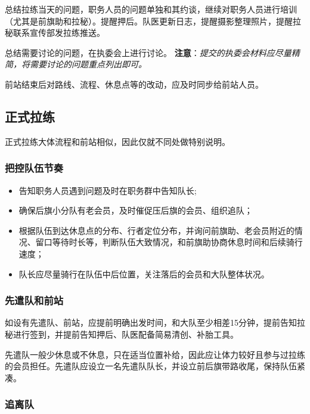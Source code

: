 \documentclass[UTF8]{ctexart}
\begin{document}
总结拉练当天的问题，职务人员的问题单独和其约谈，继续对职务人员进行培训（尤其是前旗助和拉秘）。提醒押后。队医更新日志，提醒摄影整理照片，提醒拉秘联系宣传部发拉练推送。

总结需要讨论的问题，在执委会上进行讨论。
\textbf{注意}：\textit{提交的执委会材料应尽量精简，将需要讨论的问题重点列出即可。}

前站结束后对路线、流程、休息点等的改动，应及时同步给前站人员。

\subsection{正式拉练}

正式拉练大体流程和前站相似，因此仅就不同处做特别说明。

\subsubsection{把控队伍节奏}

\begin{itemize}[nosep,left=2em]
    \item 告知职务人员遇到问题及时在职务群中告知队长;
    \item 确保后旗小分队有老会员，及时催促压后旗的会员、组织追队；
    \item 根据队伍到达休息点的分布、行者定位分布，并询问前旗助、老会员附近的情况、留口等待时长等，判断队伍大致情况，和前旗助协商休息时间和后续骑行速度；
    \item 队长应尽量骑行在队伍中后位置，关注落后的会员和大队整体状况。
\end{itemize}

\subsubsection{先遣队和前站}

如设有先遣队、前站，应提前明确出发时间，和大队至少相差15分钟，提前告知拉秘进行签到，并提前告知押后、队医配备简易清创、补胎工具。

先遣队一般少休息或不休息，只在适当位置补给，因此应让体力较好且参与过拉练的会员担任。先遣队应设立一名先遣队队长，并设立前后旗带路收尾，保持队伍紧凑。

\subsubsection{追离队}
\end{document}
